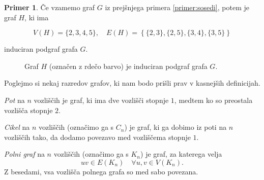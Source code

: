 \documentclass[12pt,a4paper]{amsart}
\theoremstyle{definition} %
\newtheorem{primer}[definicija]{Primer}
\theoremstyle{plain} %
\newcommand{\vozlisca}[1][G]{\ensuremath{V(#1)}}
\newcommand{\povezave}[1][G]{\ensuremath{E(#1)}}
\begin{document}
\begin{primer}
    Če vzamemo graf $G$ iz prejšnjega primera \ref{primer:sosedi}, potem je graf $H$, ki ima
    
    \[ \vozlisca[H] = \{2,3,4,5\},\quad \povezave[H] = \left\{ \{2,3\},\{2,5\},\{3,4\},\{3,5\} \right\} \]
    
    induciran podgraf grafa $G$.
    
    \begin{figure}[h]
        \caption{Graf $H$ (označen z rdečo barvo) je induciran podgraf grafa $G$.}
    \end{figure}
\end{primer}

Poglejmo si nekaj razredov grafov, ki nam bodo prišli prav v kasnejših definicijah. 

\emph{Pot} na $n$ vozliščih je graf, ki ima dve vozlišči stopnje $1$, medtem ko so preostala vozlišča stopnje $2$.

\emph{Cikel} na $n$ vozliščih (označimo ga s $C_n$) je graf, ki ga dobimo iz poti na $n$ vozliščih tako, da dodamo povezavo med vozliščema stopnje $1$.

\emph{Polni graf} na $n$ vozliščih (označimo ga s $K_n$) je graf, za katerega velja 
\[ uv \in \povezave[K_n] \quad \forall u,v \in \vozlisca[K_n].\] 
Z besedami, vsa vozlišča polnega grafa so med sabo povezana.
\end{document}
